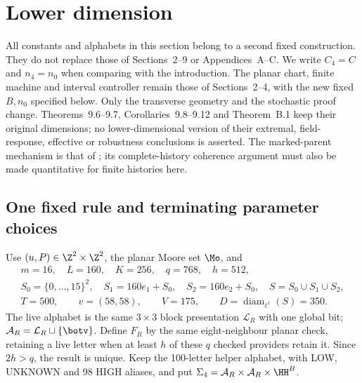\section{Lower dimension}\label{sec:lower}

All constants and alphabets in this section belong to a second fixed construction. They do not replace those of Sections~2--9 or Appendices~A--C. We write $C_4=C$ and $n_4=n_0$ when comparing with the introduction. The planar chart, finite machine and interval controller remain those of Sections~2--4, with the new fixed $B,n_0$ specified below. Only the transverse geometry and the stochastic proof change. Theorems~9.6--9.7, Corollaries~9.8--9.12 and Theorem~B.1 keep their original dimensions; no lower-dimensional version of their extremal, field-response, effective or robustness conclusions is asserted. The marked-parent mechanism is that of \cite[Section~12, Lemmas~12.3--12.4]{DMforgetLower}; its complete-history coherence argument must also be made quantitative for finite histories here.

\subsection{One fixed rule and terminating parameter choices}

Use $(u,P)\in\Z^2\times\Z^2$, the planar Moore set $\Mo$, and
\[
 \begin{gathered}
 m=16,\quad L=160,\quad K=256,\quad q=768,\quad h=512,\\
 S_0=\{0,\ldots,15\}^2,\quad S_1=160e_1+S_0,\quad
 S_2=160e_2+S_0,\quad S=S_0\cup S_1\cup S_2,\\
 T=500,\qquad v=(58,58),\qquad V=175,\qquad
 D=\operatorname{diam}_{\ell^1}(S)=350.
 \end{gathered}
\]
The live alphabet is the same $3\times3$ block presentation $\mathcal L_R$ with one global bit; $\mathcal A_R=\mathcal L_R\sqcup\{\botv\}$. Define $F_R$ by the same eight-neighbour planar check, retaining a live letter when at least $h$ of these $q$ checked providers retain it. Since $2h>q$, the result is unique. Keep the 100-letter helper alphabet, with LOW, UNKNOWN and 98 HIGH aliases, and put $\Sigma_4=\mathcal A_R\times\mathcal A_R\times\HH^B$.

